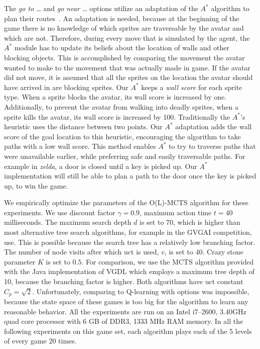 The \emph{go to \ldots} and \emph{go near \ldots} options utilize an adaptation
of the $A^*$ algorithm to plan their routes~\cite{hart1968formal}. An
adaptation is needed, because at the beginning of the game there is no knowledge
of which sprites are traversable by the avatar and which are not. Therefore,
during every move that is simulated by the agent, the $A^*$ module has to
update its beliefs about the location of walls and other blocking objects. This
is accomplished by comparing the movement the avatar wanted to make to the
movement that was actually made in game. If the avatar did not move, it is
assumed that all the sprites on the location the avatar should have arrived in
are blocking sprites. Our $A^*$ keeps a \emph{wall score} for each sprite type.
When a sprite blocks the avatar, its wall score is increased by one.
Additionally, to prevent the avatar from walking into deadly sprites, when a
sprite kills the avatar, its wall score is increased by 100.  Traditionally the
$A^*$'s heuristic uses the distance between two points. Our $A^*$ adaptation
adds the wall score of the goal location to this heuristic, encouraging the
algorithm to take paths with a low wall score. This method enables $A^*$ to
try to traverse paths that were unavailable earlier, while preferring safe and
easily traversable paths. For example in \textit{zelda}, a door is closed until
a key is picked up. Our $A^*$ implementation will still be able to plan a path
to the door once the key is picked up, to win the game.

We empirically optimize the parameters of the O(L)-MCTS algorithm
for these experiments. We use discount factor $\gamma = 0.9$, maximum action
time $t = 40$ milliseconds. The maximum search depth $d$ is set to 70, which is
higher than most alternative tree search algorithms, for example in the GVGAI
competition, use. This is possible because the search tree has a relatively low
branching factor. The number of node visits after which \textsf{uct} is used,
$v$, is set to 40. Crazy stone parameter $K$ is set to $0.5$.  For comparison,
we use the MCTS algorithm provided with the Java implementation of VGDL which
employs a maximum tree depth of 10, because the branching factor is higher. Both
algorithms have \textsf{uct} constant $C_p = \sqrt{2}$. Unfortunately, comparing
to Q-learning with options was impossible, because the state space of these
games is too big for the algorithm to learn any reasonable behavior. All the
experiments are run on an Intel i7--2600, 3.40GHz quad core processor with 6 GB
of DDR3, 1333 MHz RAM memory. In all the following experiments on this game set,
each algorithm plays each of the 5 levels of every game 20 times.

